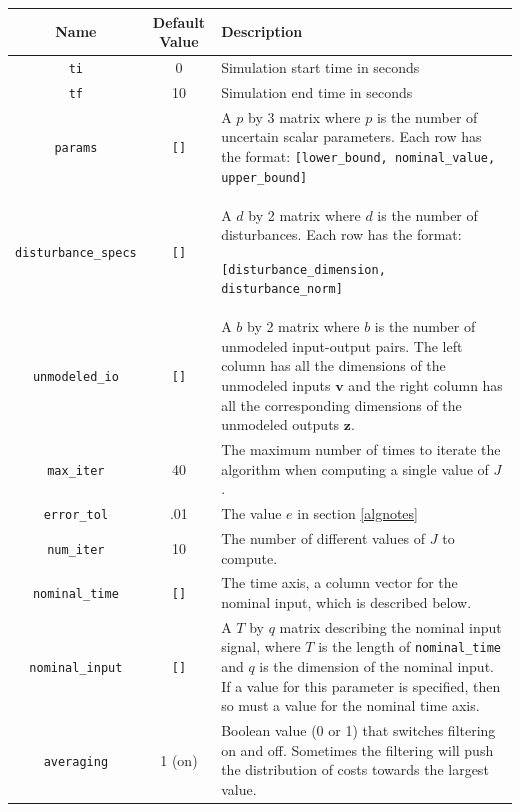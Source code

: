 \documentclass{article}
\begin{document}
\begin{table}[H]
\begin{center}
\begin{tabular}{| c | c | p{9cm} |}
\hline
\textbf{Name} & \textbf{Default Value} & \textbf{Description} \\
\hline
\texttt{ti} & 0 & Simulation start time in seconds \\
\hline 
\texttt{tf} & 10 & Simulation end time in seconds \\
\hline
\texttt{params} & \texttt{[]} & A $p$ by 3 matrix where $p$ is the number of
uncertain scalar parameters. Each row has the format:
\texttt{[lower\_bound, nominal\_value, upper\_bound]}\\
\hline
\texttt{disturbance\_specs} & \texttt{[]} & A $d$ by 2 matrix where $d$ is the
number of disturbances. Each row has the format:

\texttt{[disturbance\_dimension, disturbance\_norm]} \\
\hline
\texttt{unmodeled\_io} & \texttt{[]} & A $b$ by 2 matrix where $b$ is the number
of unmodeled input-output pairs. The left column has all the dimensions of the
unmodeled inputs $\mathbf{v}$ and the right column has all the corresponding
dimensions of the unmodeled outputs $\mathbf{z}$.\\
\hline
\texttt{max\_iter} & 40 & The maximum number of times to iterate the algorithm
when computing a single value of $J$.\\
\hline
\texttt{error\_tol} & .01 & The value $e$ in section \ref{algnotes} \\
\hline
\texttt{num\_iter} & 10 & The number of different values of $J$ to compute. \\
\hline
\texttt{nominal\_time} & \texttt{[]} & The time axis, a column vector for the
nominal input, which is described below. \\
\hline
\texttt{nominal\_input} & \texttt{[]} & A $T$ by $q$ matrix describing the
nominal input signal, where $T$ is the length of \texttt{nominal\_time} and $q$
is the dimension of the nominal input. If a value for this parameter is
specified, then so must a value for the nominal time axis. \\
\hline
\texttt{averaging} & 1 (on) & Boolean value (0 or 1) that switches filtering on
and off. Sometimes the filtering will push the distribution of costs towards the
largest value.\\
\hline
\end{tabular}
\label{inputparameters}
\end{center}
\end{table}
\end{document}
